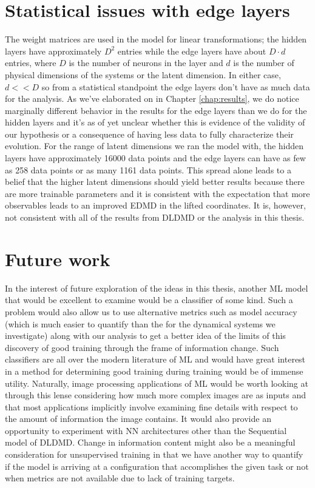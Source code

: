\section{Statistical issues with edge layers}
The weight matrices are used in the model for linear transformations; the hidden layers 
have approximately $D^2$ entries while the edge layers 
have about $D\cdot d$ entries, where $D$ is the number of neurons in the layer and $d$ is the number 
of physical dimensions of the systems or the latent dimension. In either case, $d <\!\!< D$ so from a 
statistical standpoint the edge layers don't have as much data for the analysis. As we've elaborated on 
in Chapter \ref{chap:results}, we do notice marginally different behavior in the results for the edge 
layers than we do for the hidden layers and it's as of yet unclear whether this is evidence of the 
validity of our hypothesis or a consequence of having less data to fully characterize their evolution. 
For the range of latent dimensions we ran the model with, the hidden layers have approximately 16000 
data points and the edge layers can have as few as 258 data points or as many 1161 data points. This
spread alone leads to a belief that the higher latent dimensions should yield better results because
there are more trainable parameters and it is consistent with the expectation that more observables 
leads to an improved EDMD in the lifted coordinates. It is, however, not consistent with all of the
results from DLDMD or the analysis in this thesis.

\section{Future work}
In the interest of future exploration of the ideas in this thesis, another ML model that would be 
excellent to examine would be a classifier of some kind. Such a problem would also allow us to use 
alternative metrics such as model accuracy (which is much easier to quantify than the for the dynamical 
systems we investigate) along with our analysis to get a better idea of the limits of this discovery of 
good training through the frame of information change. Such classifiers are all over the modern literature 
of ML and would have great interest in a method for determining good training during training would be of 
immense utility. Naturally, image processing applications of ML would be worth looking at through this 
lense considering how much more complex images are as inputs and that most applications implicitly
involve examining fine details with respect to the amount of information the image contains. It would
also provide an opportunity to experiment with NN architectures other than the Sequential model 
of DLDMD. 
Change in information content might also be a meaningful consideration for unsupervised training in 
that we have another way to quantify if the model is arriving at a configuration that accomplishes the 
given task or not when metrics are not available due to lack of training targets. 